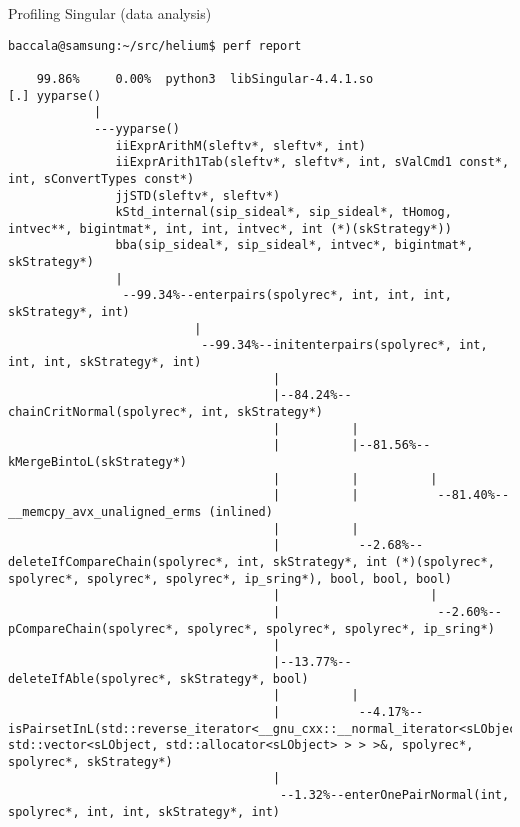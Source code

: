 \documentclass[11pt]{beamer}
\begin{document}
\begin{frame}[fragile]{Profiling Singular (data analysis)}
\tiny\begin{verbatim}
baccala@samsung:~/src/helium$ perf report

    99.86%     0.00%  python3  libSingular-4.4.1.so                      [.] yyparse()
            |
            ---yyparse()
               iiExprArithM(sleftv*, sleftv*, int)
               iiExprArith1Tab(sleftv*, sleftv*, int, sValCmd1 const*, int, sConvertTypes const*)
               jjSTD(sleftv*, sleftv*)
               kStd_internal(sip_sideal*, sip_sideal*, tHomog, intvec**, bigintmat*, int, int, intvec*, int (*)(skStrategy*))
               bba(sip_sideal*, sip_sideal*, intvec*, bigintmat*, skStrategy*)
               |          
                --99.34%--enterpairs(spolyrec*, int, int, int, skStrategy*, int)
                          |          
                           --99.34%--initenterpairs(spolyrec*, int, int, int, skStrategy*, int)
                                     |          
                                     |--84.24%--chainCritNormal(spolyrec*, int, skStrategy*)
                                     |          |          
                                     |          |--81.56%--kMergeBintoL(skStrategy*)
                                     |          |          |          
                                     |          |           --81.40%--__memcpy_avx_unaligned_erms (inlined)
                                     |          |          
                                     |           --2.68%--deleteIfCompareChain(spolyrec*, int, skStrategy*, int (*)(spolyrec*, spolyrec*, spolyrec*, spolyrec*, ip_sring*), bool, bool, bool)
                                     |                     |          
                                     |                      --2.60%--pCompareChain(spolyrec*, spolyrec*, spolyrec*, spolyrec*, ip_sring*)
                                     |          
                                     |--13.77%--deleteIfAble(spolyrec*, skStrategy*, bool)
                                     |          |          
                                     |           --4.17%--isPairsetInL(std::reverse_iterator<__gnu_cxx::__normal_iterator<sLObject*, std::vector<sLObject, std::allocator<sLObject> > > >&, spolyrec*, spolyrec*, skStrategy*)
                                     |          
                                      --1.32%--enterOnePairNormal(int, spolyrec*, int, int, skStrategy*, int)
\end{verbatim}
\end{frame}
\end{document}
